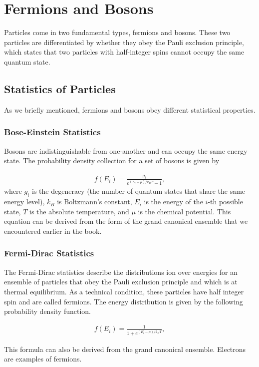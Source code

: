 \documentclass[book.tex]{subfiles}
\begin{document}
\chapter{Fermions and Bosons}

Particles come in two fundamental types, fermions and bosons. These two particles are differentiated by whether they obey the Pauli exclusion principle, which states that two particles with half-integer spins cannot occupy the same quantum state.

\section{Statistics of Particles}

As we briefly mentioned, fermions and bosons obey different statistical properties.

\subsection{Bose-Einstein Statistics}

Bosons are indistinguishable from one-another and can occupy the same energy state. The probability density collection for a set of bosons is given by

\begin{align}
f(E_i) = \frac{g_i}{e^{(E_i - \mu)/k_BT} - 1},
\end{align}
where $g_i$ is the degeneracy (the number of quantum states that share the same energy level), $k_B$ is Boltzmann's constant, $E_i$ is the energy of the $i$-th possible state, $T$ is the absolute temperature, and $\mu$ is the chemical potential. This equation can be derived from the form of the grand canonical ensemble that we encountered earlier in the book.

\subsection{Fermi-Dirac Statistics}

The Fermi-Dirac statistics describe the distributions ion over energies for an ensemble of particles that obey the Pauli exclusion principle and which is at thermal equilibrium. As a technical condition, these particles have half integer spin and are called fermions. The energy distribution is given by the following probability density function.

\begin{align}
    f(E_i) = \frac{1}{1 + e^{(E_i - \mu)/k_BT}},
\end{align}

This formula can also be derived from the grand canonical ensemble. Electrons are examples of fermions.

\end{document}
